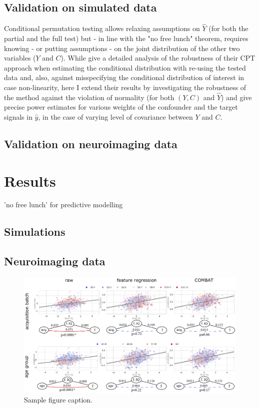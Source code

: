 \documentclass{article}
\theoremstyle{definition}
\begin{document}
\subsection{Validation on simulated data}

Conditional permutation testing allows relaxing assumptions on $\hat{Y}$ (for both the partial and the full test) but - in line with the "no free lunch" theorem, requires knowing - or putting assumptions - on the joint distribution of the other two variables ($Y$ and $C$). 
While \cite{berrett2020conditional} give a detailed analysis of the robustness of their CPT approach when estimating the conditional distribution with re-using the tested data and, also, against misspecifying the conditional distribution of interest in case non-linearity, here I extend their results by investigating the robustness of the method against the violation of normality (for both $(Y, C)$ and $\hat{Y}$) and give precise power estimates for various weights of the confounder and the target signals in $\hat{y}$, in the case of varying level of covariance between $Y$ and $C$.





\subsection{Validation on neuroimaging data}

\section{Results}

'no free lunch' for predictive modelling

\subsection{Simulations}

\subsection{Neuroimaging data}

\begin{figure}
  \centering
  \includegraphics[width=0.75\paperwidth]{fig/fig_hcp.eps}
  \caption{Sample figure caption.}
  \label{fig:fig1}
\end{figure}
\end{document}

